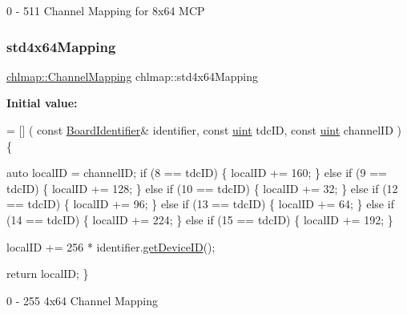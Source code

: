 0 -\/ 511 Channel Mapping for 8x64 M\+CP 

\mbox{\label{namespacechlmap_a8acaf58562324b3f691a218f08c7afe4}} 
\subsubsection{\texorpdfstring{std4x64\+Mapping}{std4x64Mapping}}
{\footnotesize\ttfamily \hyperlink{namespacechlmap_a5bb86fec567a6f1a0646881a9284bb01}{chlmap\+::\+Channel\+Mapping} chlmap\+::std4x64\+Mapping}

{\bfseries Initial value\+:}
\begin{DoxyCode}
= [] (
    \textcolor{keyword}{const} \hyperlink{class_board_identifier}{BoardIdentifier}& identifier,
    \textcolor{keyword}{const} \hyperlink{_packet_8cpp_a69aa29b598b851b0640aa225a9e5d61d}{uint} tdcID,
    \textcolor{keyword}{const} \hyperlink{_packet_8cpp_a69aa29b598b851b0640aa225a9e5d61d}{uint} channelID
) \{
    
    
    \textcolor{keyword}{auto} localID = channelID;
    \textcolor{keywordflow}{if} (8 == tdcID) \{
        localID += 160;
    \} \textcolor{keywordflow}{else} \textcolor{keywordflow}{if} (9 == tdcID) \{
        localID += 128;
    \} \textcolor{keywordflow}{else} \textcolor{keywordflow}{if} (10 == tdcID) \{
        localID += 32;
    \} \textcolor{keywordflow}{else} \textcolor{keywordflow}{if} (12 == tdcID) \{
        localID += 96;
    \} \textcolor{keywordflow}{else} \textcolor{keywordflow}{if} (13 == tdcID) \{
        localID += 64;
    \} \textcolor{keywordflow}{else} \textcolor{keywordflow}{if} (14 == tdcID) \{
        localID += 224;
    \} \textcolor{keywordflow}{else} \textcolor{keywordflow}{if} (15 == tdcID) \{
        localID += 192;
    \}

    localID += 256 * identifier.\hyperlink{class_board_identifier_a8f3d818c08107a42fe9305607be38a3b}{getDeviceID}();

    \textcolor{keywordflow}{return} localID;
\}
\end{DoxyCode}


0 -\/ 255 4x64 Channel Mapping 

\mbox{\label{namespacechlmap_a11d7121de30a32ead9032c59221b7442}} 
